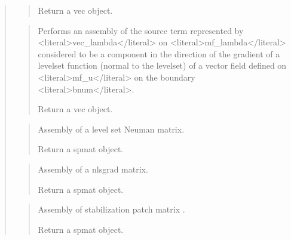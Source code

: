 \documentclass[a4paper,11pt,english]{sphinxmanual}
\begin{document}
\begin{quote}
\begin{quote}
\begin{description}
\end{description}

\sphinxAtStartPar
Return a vec object.
\end{quote}

\sphinxAtStartPar
{}
\begin{quote}

\sphinxAtStartPar
Performs an assembly of the source term represented by \textless{}literal\textgreater{}vec\_lambda\textless{}/literal\textgreater{}
on \textless{}literal\textgreater{}mf\_lambda\textless{}/literal\textgreater{} considered to be a component in the direction of the
gradient of a levelset function (normal to the levelset) of a vector
field defined on \textless{}literal\textgreater{}mf\_u\textless{}/literal\textgreater{} on the boundary \textless{}literal\textgreater{}bnum\textless{}/literal\textgreater{}.

\sphinxAtStartPar
Return a vec object.
\end{quote}

\sphinxAtStartPar
{}
\begin{quote}

\sphinxAtStartPar
Assembly of a level set Neuman  matrix.

\sphinxAtStartPar
Return a spmat object.
\end{quote}

\sphinxAtStartPar
{}
\begin{quote}

\sphinxAtStartPar
Assembly of a nlsgrad matrix.

\sphinxAtStartPar
Return a spmat object.
\end{quote}

\sphinxAtStartPar
{}
\begin{quote}

\sphinxAtStartPar
Assembly of stabilization patch matrix .

\sphinxAtStartPar
Return a spmat object.
\end{quote}
\end{quote}
\end{document}
